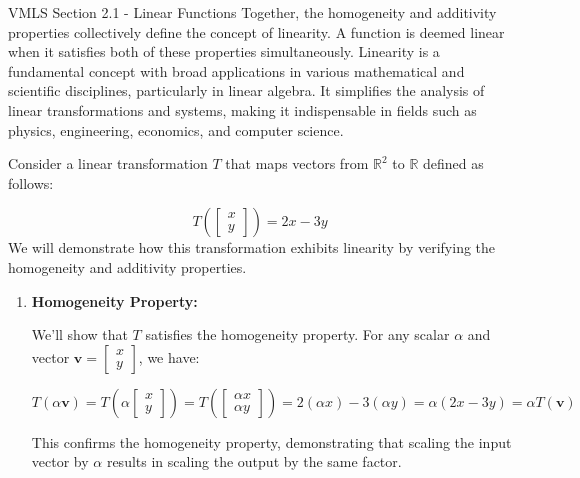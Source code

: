 \begin{notes}{VMLS Section 2.1 - Linear Functions}
    Together, the homogeneity and additivity properties collectively define the concept of linearity. A function is deemed linear when it satisfies both of these properties simultaneously. Linearity is a fundamental 
    concept with broad applications in various mathematical and scientific disciplines, particularly in linear algebra. It simplifies the analysis of linear transformations and systems, making it indispensable in fields 
    such as physics, engineering, economics, and computer science.

    \begin{Highlight}
        Consider a linear transformation \(T\) that maps vectors from \(\mathbb{R}^2\) to \(\mathbb{R}\) defined as follows:
        
        \begin{equation*}
            T\left(\begin{bmatrix} x \\ y \end{bmatrix}\right) = 2x - 3y
        \end{equation*}
        We will demonstrate how this transformation exhibits linearity by verifying the homogeneity and additivity properties.
        
        \begin{enumerate}
            \item \textbf{Homogeneity Property:}
            
            We'll show that \(T\) satisfies the homogeneity property. For any scalar \(\alpha\) and vector \(\mathbf{v} = \begin{bmatrix} x \\ y \end{bmatrix}\), we have:
            
            \[
            T(\alpha\mathbf{v}) = T\left(\alpha\begin{bmatrix} x \\ y \end{bmatrix}\right) = T\left(\begin{bmatrix} \alpha x \\ \alpha y \end{bmatrix}\right) = 2(\alpha x) - 3(\alpha y) = \alpha(2x - 3y) = \alpha T(\mathbf{v})
            \]
            
            This confirms the homogeneity property, demonstrating that scaling the input vector by \(\alpha\) results in scaling the output by the same factor.
            

\end{enumerate}
\end{Highlight}
\end{notes}

